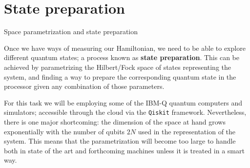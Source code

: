 
\section{State preparation}


\begin{frame}{Space parametrization and state preparation}

	Once we have ways of measuring our Hamiltonian, we need to be able to explore different quantum states; a process known as \textbf{state preparation}. This can be achieved by parametrizing the Hilbert/Fock space of states representing the system, and finding a way to prepare the corresponding quantum state in the processor given any combination of those parameters.

	\begin{multicols}{2}

		For this task we will be employing some of the IBM-Q quantum computers and simulators; accessible through the cloud via the \texttt{Qiskit} framework. Nevertheless, there is one major shortcoming: the dimension of the space at hand grows exponentially with the number of qubits $2N$ used in the representation of the system. This means that the parametrization will become too large to handle both in state of the art and forthcoming machines unless it is treated in a smart way.

		\columnbreak


\end{multicols}
\end{frame}
